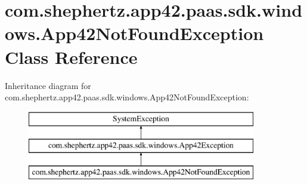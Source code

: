 \hypertarget{classcom_1_1shephertz_1_1app42_1_1paas_1_1sdk_1_1windows_1_1_app42_not_found_exception}{\section{com.\+shephertz.\+app42.\+paas.\+sdk.\+windows.\+App42\+Not\+Found\+Exception Class Reference}
\label{classcom_1_1shephertz_1_1app42_1_1paas_1_1sdk_1_1windows_1_1_app42_not_found_exception}
}
Inheritance diagram for com.\+shephertz.\+app42.\+paas.\+sdk.\+windows.\+App42\+Not\+Found\+Exception\+:\begin{figure}[H]
\begin{center}
\leavevmode
\includegraphics[height=3.000000cm]{classcom_1_1shephertz_1_1app42_1_1paas_1_1sdk_1_1windows_1_1_app42_not_found_exception}
\end{center}
\end{figure}
